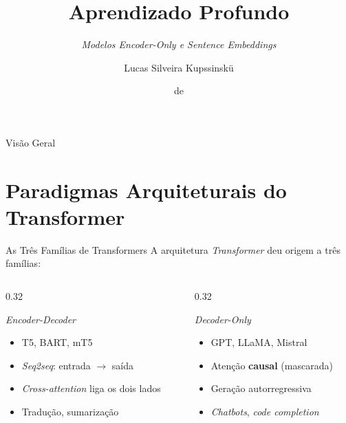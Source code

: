 \documentclass[aspectratio=169, xcolor=dvipsnames]{beamer}
\title{Aprendizado Profundo}
\subtitle{\textit{Modelos Encoder-Only e Sentence Embeddings}}
\author{Lucas Silveira Kupssinskü}
\institute
{ Machine Learning Theory and Applications Laboratory \\ PUCRS
}
\date{\mespor de \the\year}
\begin{document}
  \begin{frame}
    \titlepage
  \end{frame}

  \begin{frame}{Visão Geral}
    \tableofcontents
  \end{frame}

  \section{Paradigmas Arquiteturais do Transformer}

  \begin{frame}{As Três Famílias de Transformers}
    A arquitetura \textit{Transformer} deu origem a três famílias:
    \begin{columns}[T]
      \begin{column}{0.32\textwidth}
        \begin{block}{\textit{Encoder-Decoder}}
          \begin{itemize}
            \item T5, BART, mT5
            \item \textit{Seq2seq}: entrada $\to$ saída
            \item \textit{Cross-attention} liga os dois lados
            \item Tradução, sumarização
          \end{itemize}
        \end{block}
      \end{column}
      \begin{column}{0.32\textwidth}
        \begin{block}{\textit{Decoder-Only}}
          \begin{itemize}
            \item GPT, LLaMA, Mistral
            \item Atenção \textbf{causal} (mascarada)
            \item Geração autorregressiva
            \item \textit{Chatbots}, \textit{code completion}
          \end{itemize}
        \end{block}
      \end{column}

\end{columns}
\end{frame}
\end{document}
